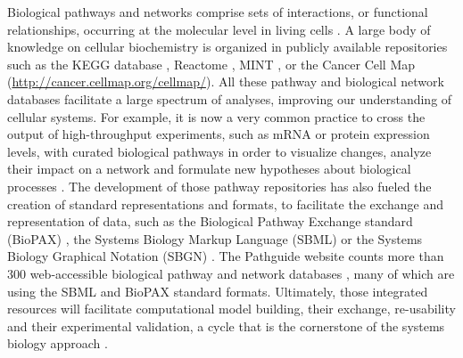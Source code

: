 \documentclass[11pt]{bmc_article_s50}
\newenvironment{bmcformat}{\begin{raggedright}\baselineskip20pt\sloppy\setboolean{publ}{false}}{\end{raggedright}\baselineskip20pt\sloppy}
\begin{document}
\begin{bmcformat}
Biological pathways and networks comprise sets of interactions, or functional
relationships, occurring at the molecular level in living cells
\cite{adriaens2008public, cary2005pathway}.
A large body of knowledge on cellular biochemistry is organized in publicly available
repositories such as the KEGG database \cite{ogata1999kegg}, Reactome
\cite{joshi2005reactome}, MINT \cite{zanzoni2002mint}, or the Cancer Cell Map
(\url{http://cancer.cellmap.org/cellmap/}). All these pathway and biological
network databases facilitate a large spectrum of analyses, improving our
understanding of cellular systems. For example, it is now a very common
practice to cross the output of high-throughput experiments, such as mRNA or
protein expression levels, with curated biological pathways in
order to visualize changes, analyze their impact on a network and
formulate new hypotheses about
biological processes \cite{saraiya2005visualizing,
gehlenborg2010visualization}. The development of those pathway repositories has
also fueled the creation of standard representations and formats, to facilitate
the exchange and representation of data, such as the Biological Pathway
Exchange standard (BioPAX) \cite{demir2010biopax}, the Systems Biology Markup
Language (SBML) \cite{hucka2003systems} or the Systems Biology Graphical
Notation (SBGN) \cite{le2009systems}. The Pathguide website counts
more than 300 web-accessible biological pathway and network databases
\cite{bader2006pathguide}, many of which are using the SBML and BioPAX standard
formats. Ultimately, those integrated resources will facilitate computational
model building, their exchange, re-usability and their experimental validation, a cycle that is the
cornerstone of the systems biology approach \cite{karlebach2008modelling,
kitano2002systems, ideker2001new}.


\end{bmcformat}
\end{document}
